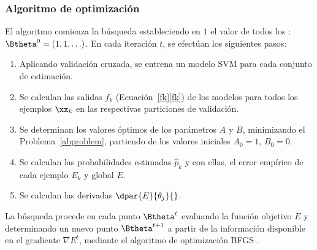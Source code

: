 %
\subsubsection{Algoritmo de optimización}
%
El algoritmo comienza la búsqueda estableciendo en $1$ el valor de
todos los : $\Btheta^0=(1,1,\ldots)$.
En cada iteración $t$, se efectúan los siguientes pasos:
%
\begin{enumerate}
\item
  Aplicando validación cruzada, se entrena un modelo SVM para cada
  conjunto de estimación.
\item
  Se calculan las salidas $f_k$
  (\iflatexml{}Ecuación~\ref{fk}\else\autoref{fk}\fi) de los modelos
  para todos los ejemplos $\xx_k$ en las respectivas particiones de
  validación.
\item
  Se determinan los valores óptimos de los parámetros $A$ y $B$,
  minimizando el Problema~\ref{abproblem}, partiendo de los valores
  iniciales $A_0=1$, $B_0=0$.
\item
  Se calculan las probabilidades estimadas $\hat{p}_k$ y con ellas, el
  error empírico de cada ejemplo $E_k$ y global $E$.
\item
  Se calculan las derivadas $\dpar{E}{\theta_j}{}$.
\end{enumerate}
%
La búsqueda procede en cada punto $\Btheta^t$ evaluando la función
objetivo $E$ y determinando un nuevo punto $\Btheta^{t+1}$ a partir de
la información disponible en el gradiente $\nabla{}E^t$, mediante el
algoritmo de optimización BFGS \cite{nocedal}.
